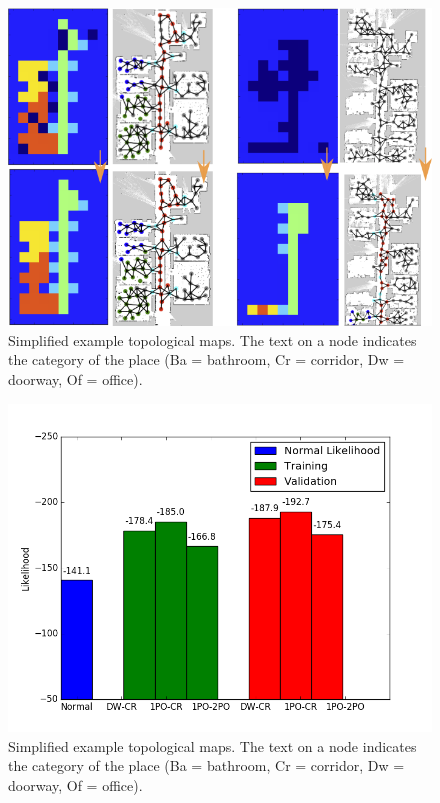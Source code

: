 \documentclass[10pt, titlepage]{article}
\theoremstyle{definition}
\begin{document}
\begin{figure}[!htb]
    \centering
    \captionsetup{width=.8\linewidth}
    \includegraphics[scale=0.7]{images/placegri_graph_illustration.png}
    \caption{Simplified example topological maps. The text on a node indicates the category of the place (Ba = bathroom, Cr = corridor, Dw = doorway, Of = office).}
    \label{fig:topomap}
\end{figure}


\begin{figure}[!htb]
    \centering
    \captionsetup{width=.8\linewidth}
    \includegraphics[scale=0.7]{images/novelty.png}
    \caption{Simplified example topological maps. The text on a node indicates the category of the place (Ba = bathroom, Cr = corridor, Dw = doorway, Of = office).}
    \label{fig:topomap}
\end{figure}
\end{document}
